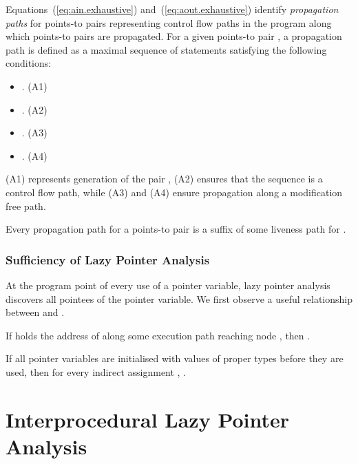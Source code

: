 \documentclass{llncs}
\newcommand{\pt}[2]{\text{}}
\begin{document}
Equations~(\ref{eq:ain.exhaustive}) and~(\ref{eq:aout.exhaustive})
identify {\em propagation paths\/} for points-to pairs representing
control flow paths in the program along which points-to pairs are
propagated. For a given points-to pair \pt{x}{y}, a propagation path is
defined as a maximal sequence of statements \text{} satisfying the following conditions:
\begin{itemize}
\item  \text{}.
	\hfill (A1) 
\item  \text{}.
	\hfill (A2) 
\item  . 
	\hfill (A3) 
\item  .
	\hfill (A4) 
\end{itemize}
(A1) represents generation of the pair \pt{x}{y}, (A2) ensures that the
sequence is a control flow path, while (A3) and (A4) ensure propagation
along a modification free path. 



\begin{theorem}
Every propagation path for a points-to pair \pt{x}{y} is a suffix of some 
liveness path for .
\end{theorem}



\subsubsection{Sufficiency of Lazy Pointer Analysis}
\label{sec:sufficiency}
At the program point of every use of a
pointer variable, lazy pointer analysis discovers all pointees of
the pointer variable. We first observe a useful relationship between
 and .

\begin{lemma}
\label{lemma.kill.def}

\end{lemma}



\begin{theorem}
\label{theorem.live.pt}
If \text{} holds the address of \text{}
along some execution path reaching node , then \text{}.
\end{theorem}


\begin{corollary}
\label{cor.def.not.empty}
If all pointer variables are initialised with values of proper types
before they are used, then for every indirect assignment \text{},
\text{}.
\end{corollary}


\section{Interprocedural Lazy Pointer Analysis}
\label{sec:interprocedural}
\end{document}
